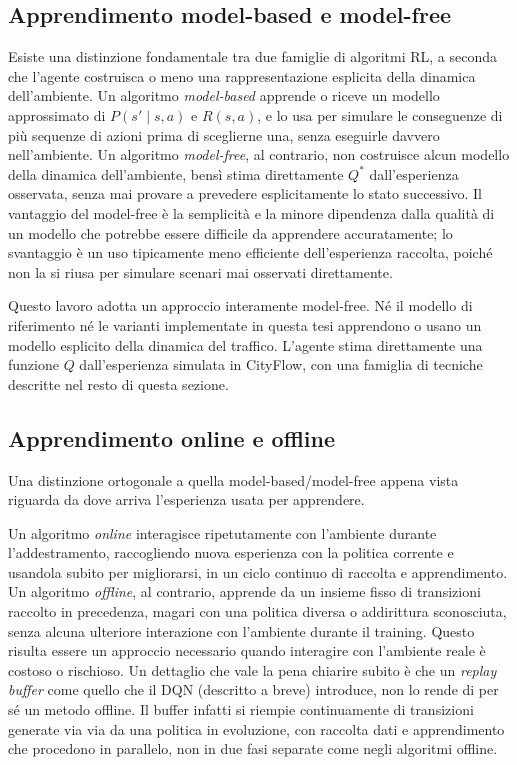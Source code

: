 \subsection{Apprendimento model-based e model-free}
\label{subsec:model-free}

Esiste una distinzione fondamentale tra due famiglie di algoritmi RL, a
seconda che l'agente costruisca o meno una rappresentazione esplicita
della dinamica dell'ambiente. Un algoritmo \emph{model-based} apprende
o riceve un modello approssimato di $P(s'\mid s,a)$ e $R(s,a)$, e lo usa
per simulare le conseguenze di più
sequenze di azioni prima di sceglierne una, senza eseguirle davvero nell'ambiente.
Un algoritmo \emph{model-free}, al contrario, non costruisce alcun modello della dinamica dell'ambiente, bensì stima
direttamente $Q^*$ dall'esperienza osservata, senza mai
provare a prevedere esplicitamente lo stato successivo. Il vantaggio del
model-free è la semplicità e la minore dipendenza dalla qualità di un
modello che potrebbe essere difficile da apprendere accuratamente; lo
svantaggio è un uso tipicamente meno efficiente dell'esperienza raccolta,
poiché non la si riusa per simulare scenari mai osservati direttamente.

Questo lavoro adotta un approccio interamente model-free. Né il
modello di riferimento \citep{wang2022metastgat} né le varianti
implementate in questa tesi apprendono o
usano un modello esplicito della dinamica del traffico. L'agente stima
direttamente una funzione $Q$ dall'esperienza simulata in CityFlow, con una
famiglia di tecniche descritte nel resto di questa sezione.

\subsection{Apprendimento online e offline}
\label{subsec:online-offline}

Una distinzione ortogonale a quella model-based/model-free appena vista
riguarda da dove arriva l'esperienza usata per apprendere.

Un algoritmo \emph{online} interagisce ripetutamente con l'ambiente
durante l'addestramento, raccogliendo nuova esperienza con la politica
corrente e usandola subito per migliorarsi, in un ciclo continuo di raccolta e apprendimento.
Un algoritmo \emph{offline}, al contrario, apprende da un
insieme fisso di transizioni raccolto in precedenza, magari con una
politica diversa o addirittura sconosciuta, senza alcuna ulteriore
interazione con l'ambiente durante il training. Questo risulta essere un approccio necessario
quando interagire con l'ambiente reale è costoso o rischioso.
Un dettaglio che vale la pena chiarire subito è che un
\emph{replay buffer} come quello che il DQN (descritto a breve) introduce,
non lo rende di per sé un metodo offline. Il buffer infatti si riempie
continuamente di transizioni generate via via da una politica in
evoluzione, con raccolta dati e apprendimento che procedono in parallelo, non in
due fasi separate come negli algoritmi offline.

